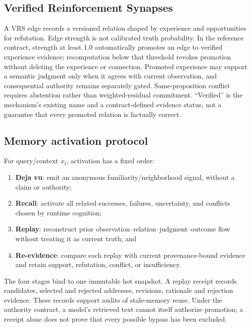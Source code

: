 \documentclass[11pt]{article}
\newcommand{\vrs}{VRS}
\begin{document}
\subsection{Verified Reinforcement Synapses}

A \vrs{} edge records a versioned relation shaped by experience and opportunities for refutation. Edge strength is not calibrated truth probability. In the reference contract, strength at least 1.0 automatically promotes an edge to verified experience evidence; recomputation below that threshold revokes promotion without deleting the experience or connection. Promoted experience may support a semantic judgment only when it agrees with current observation, and consequential authority remains separately gated. Same-proposition conflict requires abstention rather than weighted-residual commitment. ``Verified'' is the mechanism's existing name and a contract-defined evidence status, not a guarantee that every promoted relation is factually correct.

\subsection{Memory activation protocol}

For query/context $x_t$, activation has a fixed order:
\begin{enumerate}[leftmargin=1.5em]
  \item \textbf{Deja vu}: emit an anonymous familiarity/neighborhood signal, without a claim or authority;
  \item \textbf{Recall}: activate all related successes, failures, uncertainty, and conflicts chosen by runtime cognition;
  \item \textbf{Replay}: reconstruct prior observation--relation--judgment--outcome flow without treating it as current truth; and
  \item \textbf{Re-evidence}: compare each replay with current provenance-bound evidence and retain support, refutation, conflict, or insufficiency.
\end{enumerate}

The four stages bind to one immutable hot snapshot. A replay receipt records candidates, selected and rejected addresses, revisions, rationale and rejection evidence. These records support audits of stale-memory reuse. Under the authority contract, a model's retrieved text cannot itself authorize promotion; a receipt alone does not prove that every possible bypass has been excluded.
\end{document}
